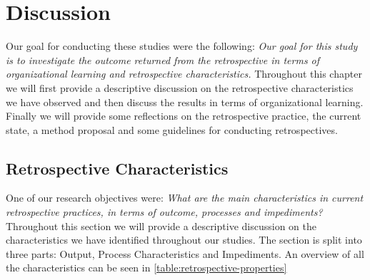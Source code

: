 \chapter{Discussion}
Our goal for conducting these studies were the following: \textit{Our goal for this study is to investigate the outcome returned from the retrospective in terms of organizational learning and retrospective characteristics.} Throughout this chapter we will first provide a descriptive discussion on the retrospective characteristics we have observed and then discuss the results in terms of organizational learning. Finally we will provide some reflections on the retrospective practice, the current state, a method proposal and some guidelines for conducting retrospectives. 

\section{Retrospective Characteristics}
One of our research objectives were: \textit{What are the main characteristics in current retrospective practices, in
terms of outcome, processes and impediments?} Throughout this section we will provide a descriptive discussion on the characteristics we have identified throughout our studies. The section is split into three parts: Output, Process Characteristics and Impediments. An overview of all the characteristics can be seen in \autoref{table:retrospective-properties}

